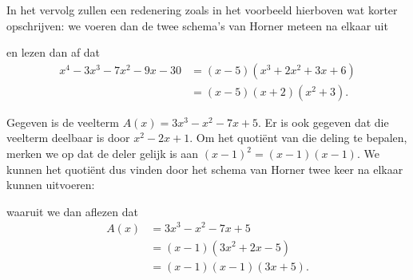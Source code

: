 \documentclass{ximera}
\begin{document}
In het vervolg zullen een redenering zoals in het voorbeeld hierboven wat korter opschrijven: we voeren dan de twee schema's van Horner meteen na elkaar uit
\renewcommand{\kolbreed}{\widthof{\(-30\)}}


en lezen dan af dat  
\begin{align*}
x^4 - 3x^3 - 7x^2 - 9 x - 30 
& = (x-5)(x^3 + 2x^2 + 3x + 6) \\
& = (x-5)(x+2)(x^2+3).
\end{align*}

\begin{example} 
Gegeven is de veelterm \(A(x) = 3 x^3 - x^2 - 7 x + 5\). Er is ook gegeven dat die veelterm deelbaar is door \(x^2-2x+1\). Om het quotiënt van die deling te bepalen, merken we op dat de deler gelijk is aan \((x-1)^2 = (x-1)(x-1)\). We kunnen het quotiënt dus vinden door het schema van Horner twee keer na elkaar kunnen uitvoeren:
\renewcommand{\kolbreed}{\widthof{\(-30\)}}


waaruit we dan aflezen dat 
\begin{align*}
A(x) 
& = 3x^3 - x^2 - 7x + 5 \\
& = (x-1)(3x^2+2x-5) \\
& = (x-1)(x-1)(3x+5).
\end{align*}
\end{example} 
\end{document}
